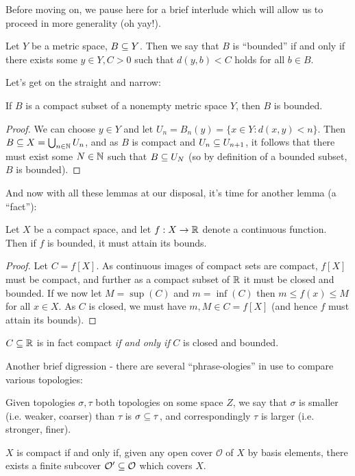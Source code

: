 Before moving on, we pause here for a brief interlude which will allow us to proceed in more generality (oh yay!).
\begin{boxdefinition}
    Let $Y$ be a metric space, $B\subseteq Y$. Then we say that $B$ is ``bounded'' if and only if there exists some $y\in Y, C>0$ such that $d(y,b)<C$ holds for all $b \in B$.
\end{boxdefinition}
Let's get on the straight and narrow:
\begin{boxlemma}
    If $B$ is a compact subset of a nonempty metric space $Y$, then $B$ is bounded.
\end{boxlemma}
\begin{proof}
    We can choose $y \in Y$ and let $U_n=B_n(y)=\{x\in Y: d(x,y)<n\}$. Then $B\subseteq X=\bigcup_{n\in \mathbb{N}}U_n$, and as $B$ is compact and $U_n\subseteq U_{n+1}$, it follows that there must exist some $N\in \mathbb{N}$ such that $B\subseteq U_N$ (so by definition of a bounded subset, $B$ is bounded).
\end{proof}
And now with all these lemmas at our disposal, it's time for another lemma (a ``fact''):
\begin{boxlemma}
    Let $X$ be a compact space, and let $f:X\rightarrow \mathbb{R}$ denote a continuous function. Then if $f$ is bounded, it must attain its bounds. 
\end{boxlemma}
\begin{proof}
    Let $C=f[X]$. As continuous images of compact sets are compact, $f[X]$ must be compact, and further as a compact subset of $\mathbb{R}$ it must be closed and bounded. If we now let $M=\sup(C)$ and $m=\inf(C)$ then $m\leq f(x)\leq M$ for all $x\in X$. As $C$ is closed, we must have $m, M\in C=f[X]$ (and hence $f$ must attain its bounds).
\end{proof}
\begin{remark}
    $C\subseteq \mathbb{R}$ is in fact compact \textit{if and only if } $C$ is closed and bounded.
\end{remark}

Another brief digression - there are several ``phrase-ologies'' in use to compare various topologies:

\begin{remark}
    Given topologies $\sigma, \tau$ both topologies on some space $Z$, we say that $\sigma$ is smaller (i.e. weaker, coarser) than $\tau$ is $\sigma\subseteq \tau$, and correspondingly $\tau$ is larger (i.e. stronger, finer).
\end{remark}

\begin{remark}
    $X$ is compact if and only if, given any open cover $\mathcal{O}$ of $X$ by basis elements, there exists a finite subcover $\mathcal{O'}\subseteq\mathcal{O}$ which covers $X$.
\end{remark}

